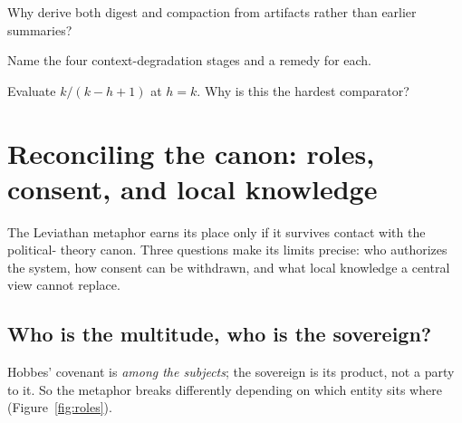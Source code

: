 \documentclass[11pt,a4paper]{article}
\theoremstyle{definition}
\theoremstyle{plain}
\begin{document}
\pdexercisepointer*{\ref{ex:ls-digest-is-compaction}}{\ref{ex:ls-paging-ratio-hand}}{\pageref{ex:ls-digest-is-compaction}}

\begin{pdrecitation}
\item Why derive both digest and compaction from artifacts rather than earlier summaries?
\item Name the four context-degradation stages and a remedy for each.
\item Evaluate $k/(k-h+1)$ at $h=k$. Why is this the hardest comparator?
\end{pdrecitation}

\section{Reconciling the canon: roles, consent, and local knowledge}\label{sec:consent-canon}

The Leviathan metaphor earns its place only if it survives contact with the political-
theory canon. Three questions make its limits precise: who authorizes the system,
how consent can be withdrawn, and what local knowledge a central view cannot replace.

\subsection{Who is the multitude, who is the sovereign?}\label{sec:roles}

Hobbes' covenant is \emph{among the subjects}; the sovereign is its product, not a
party to it. So the metaphor breaks differently depending on which entity sits where
(Figure~\ref{fig:roles}).
\end{document}

